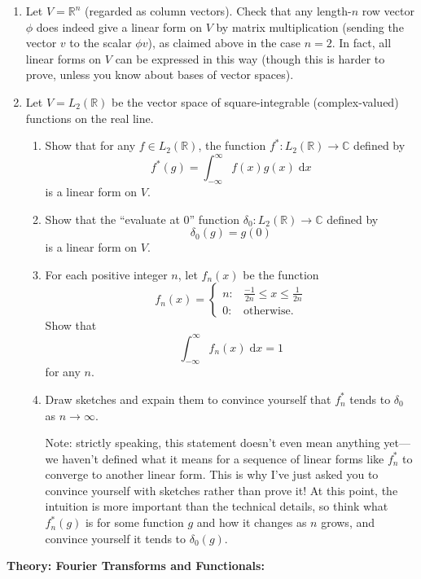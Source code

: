 \documentclass{article}
\newcommand{\diff}{\;\mathrm{d}}
\begin{document}
\begin{enumerate}
	\item
		 Let $V=\mathbb{R}^n$ (regarded as column vectors). Check that any length-$n$ row vector $\phi$ does indeed give a linear form on $V$ by matrix multiplication (sending the vector $v$ to the scalar $\phi v$), as claimed above in the case $n=2$. In fact, all linear forms on $V$ can be expressed in this way (though this is harder to prove, unless you know about bases of vector spaces).
	\item Let $V=L_2(\mathbb{R})$ be the vector space of square-integrable (complex-valued) functions on the real line.
		\begin{enumerate}
			\item Show that for any $f\in L_2(\mathbb{R})$, the function $f^*:L_2(\mathbb{R})\to \mathbb{C}$ defined by
				\[f^*(g)=\int_{-\infty}^\infty f(x)g(x)\diff x\]
				is a linear form on $V$.
			\item Show that the ``evaluate at 0'' function $\delta_0:L_2(\mathbb{R})\to \mathbb{C}$ defined by
				\[\delta_0(g)=g(0)\]
				is a linear form on $V$.
			\item For each positive integer $n$, let $f_n(x)$ be the function
				\[f_n(x)=\begin{cases}
							n:& \frac{-1}{2n}\leq x \leq \frac{1}{2n}\\
							0:& \mbox{otherwise}.
						\end{cases}\]
				Show that
				\[\int_{-\infty}^\infty f_n(x)\diff x =1\]
				for any $n$.
			\item Draw sketches and expain them to convince yourself that $f_n^*$ tends to $\delta_0$ as $n\to\infty$.
			
				Note: strictly speaking, this statement doesn't even mean anything yet---we haven't defined what it means for a sequence of linear forms like $f_n^*$ to converge to another linear form. This is why I've just asked you to convince yourself with sketches rather than prove it! At this point, the intuition is more important than the technical details, so think what $f_n^*(g)$ is for some function $g$ and how it changes as $n$ grows, and convince yourself it tends to $\delta_0(g)$.
		\end{enumerate}
\end{enumerate}







\textbf{Theory: Fourier Transforms and Functionals:}\bigskip
\end{document}
